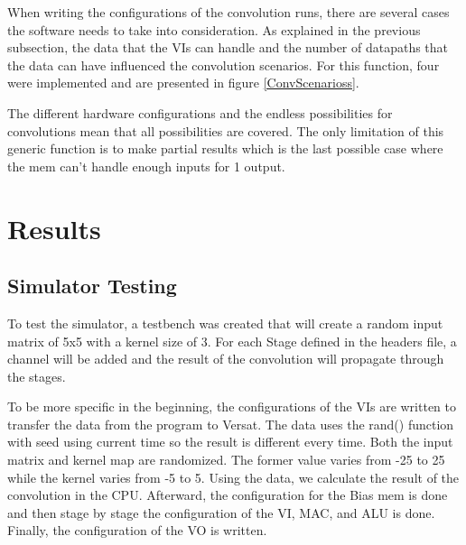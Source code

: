 \documentclass[conference]{IEEEtran}
\begin{document}
When writing the configurations of the convolution runs, there are several cases the software needs to take into consideration.
As explained in the previous subsection, the data that the VIs can handle and the number of datapaths that the data can have influenced
the convolution scenarios. For this function, four were implemented and are presented in figure \ref{ConvScenarioss}.


The different hardware configurations and the endless possibilities for convolutions mean that all possibilities are covered. 
The only limitation of this generic function is to make partial results which is the last possible case where the mem can't handle enough inputs for 
1 output.




% 




\section{Results}
\label{chapter:results}

\subsection{Simulator Testing}
\label{section:simtest}

To test the simulator, a testbench was created that will create a random input matrix of 5x5
with a kernel size of 3. For each Stage defined in the headers file, a channel will be added and
the result of the convolution will propagate through the stages.

To be more specific in the beginning, the configurations of the VIs are written to transfer the data
from the program to Versat. The data uses the rand() function with seed using current time
so the result is different every time. Both the input matrix and kernel map are randomized.
The former value varies from -25 to 25 while the kernel varies from -5 to 5. Using the data, 
we calculate the result of the convolution in the CPU. Afterward, the configuration for the Bias mem
is done and then stage by stage the configuration of the VI, MAC, and ALU is done. Finally, the
configuration of the VO is written.
\end{document}
